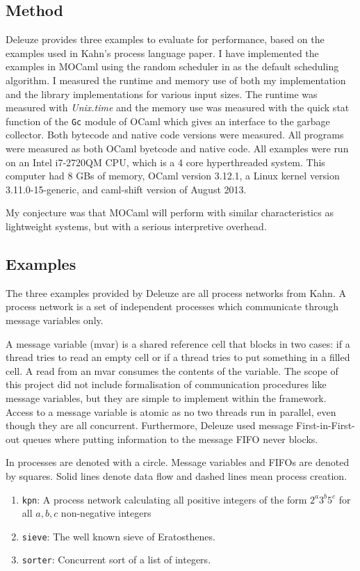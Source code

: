 \documentclass[12pt,twoside,notitlepage]{report}
\theoremstyle{plain}%
\theoremstyle{definition}
\theoremstyle{remark}
\begin{document}
\subsection{Method}
Deleuze provides three examples to evaluate for performance, based on the examples used in Kahn's process language paper\cite{kahn1976coroutines}. I have implemented the examples in MOCaml using the random scheduler in  as the default scheduling algorithm. I measured the runtime and memory use of both my implementation and the library implementations for various input sizes. The runtime was measured with \textit{Unix.time} and the memory use was measured with the quick stat function of the \verb|Gc| module of OCaml which gives an interface to the garbage collector. Both bytecode and native code versions were measured. All programs were measured as both OCaml byetcode and native code. All examples were run on an Intel i7-2720QM CPU, which is a 4 core hyperthreaded system. This computer had 8 GBs of memory, OCaml version 3.12.1, a Linux kernel version 3.11.0-15-generic, and caml-shift version of August 2013.


My conjecture was that MOCaml will perform with similar characteristics as lightweight systems, but with a serious interpretive overhead.
\subsection{Examples}
The three examples provided by Deleuze are all process networks from Kahn\cite{kahn1976coroutines}. A process network is a set of independent processes which communicate through message variables only. 

A message variable (mvar) is a shared reference cell that blocks in two cases: if a thread tries to read an empty cell or if a thread tries to put something in a filled cell. A read from an mvar consumes the contents of the variable. The scope of this project did not include formalisation of communication procedures like message variables, but they are simple to implement within the framework. Access to a message variable is atomic as no two threads run in parallel, even though they are all concurrent. Furthermore, Deleuze used message First-in-First-out queues where putting information to the message FIFO never blocks. 

In  processes are denoted with a circle. Message variables and FIFOs are denoted by squares. Solid lines denote data flow and dashed lines mean process creation.
\begin{enumerate}
\item{\verb|kpn|: A process network calculating all positive integers of the form $ 2^a3^b5^c $ for all $ a,b,c $ non-negative integers}
\item{\verb|sieve|: The well known sieve of Eratosthenes.}
\item{\verb|sorter|: Concurrent sort of a list of integers.}
\end{enumerate}
\end{document}

